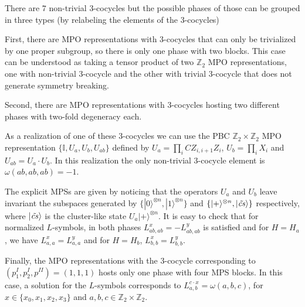 \documentclass[a4paper,twocolumn,11pt,accepted=2023-02-10]{quantumarticle}
\newcommand{\id}{\mathbb{I}}
\begin{document}
There are $7$ non-trivial $3$-cocycles but the possible phases of those can be grouped in three types (by relabeling the elements of the $3$-cocycles)

First, there are MPO representations with $3$-cocycles that can only be trivialized by one proper subgroup, so there is only one phase with two blocks. This case can be understood as taking a tensor product of two $\mathbb{Z}_2$ MPO representations, one with non-trivial $3$-cocycle and the other with trivial $3$-cocycle that does not generate symmetry breaking.

Second, there are MPO representations with $3$-cocycles hosting two different phases with two-fold degeneracy each. 


As a realization of one of these $3$-cocycles we can use the PBC $\mathbb{Z}_2\times \mathbb{Z}_2$ MPO representation $\{\id,U_a,U_b,U_{ab}\}$ defined by $U_a=\prod_i CZ_{i,i+1}Z_i$, $U_b= \prod_i X_i$ and $U_{ab}= U_a \cdot U_b$. In this realization the only non-trivial $3$-cocycle element is $\omega(ab,ab,ab)=-1$.

The explicit MPSs are given by noticing that the operators $U_a$ and $U_b$ leave invariant the subspaces generated by $\{ | 0\rangle^{\otimes n}, | 1\rangle^{\otimes n} \}$ and $\{ | + \rangle^{\otimes n} ,| \tilde{\it cs} \rangle \}$ respectively, where $| \tilde{\it cs} \rangle$ is the cluster-like state $U_a | + \rangle^{\otimes n}$. It is easy to check that for normalized ${L}$-symbols, in both phases  ${L}_{ab,ab}^{x} = - {L}_{ab,ab}^{y}$ is satisfied and for $H=H_a$, we have ${L}_{a,a}^{x} =  {L}_{a,a}^{y}$ and for $H=H_b$, ${L}_{b,b}^{x} =  {L}_{b,b}^{y}$.

Finally, the MPO representations with the $3$-cocycle corresponding to $(p_1^I,p_2^I,p^{II}) = (1,1,1)$ hosts only one phase with four MPS blocks. In this case, a solution for the ${L}$-symbols corresponds to ${L}_{a,b}^{c{\cdot} x} = \omega(a,b,c)$, for $x\in \{x_0,x_1,x_2,x_3\}$ and $a,b,c\in \mathbb{Z}_2 \times \mathbb{Z}_2 $. 
\end{document}
